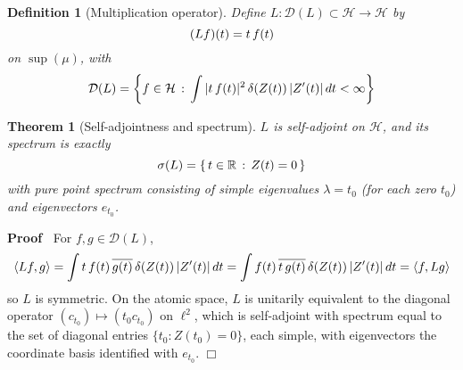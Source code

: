 \documentclass{article}
\newenvironment{proof}{\noindent\textbf{Proof\ }}{\hspace*{\fill}$\Box$\medskip}
\newtheorem{definition}{Definition}
\newtheorem{theorem}{Theorem}
\begin{document}
\begin{definition}
  [Multiplication operator] Define $L : \mathcal{D} (L) \subset \mathcal{H}
  \to \mathcal{H}$ by
  \begin{equation}
    (Lf) (t) = t \hspace{0.17em} f (t)
  \end{equation}
  on $\sup (\mu)$, with
  \begin{equation}
    \mathcal{D} (L) = \left\{ f \in \mathcal{H} \hspace{0.17em} :
    \hspace{0.17em} \int |t \hspace{0.17em} f (t) |^2  \hspace{0.17em} \delta
    (Z (t)) \hspace{0.17em} |Z' (t) | \hspace{0.17em} dt < \infty \right\}
  \end{equation}
\end{definition}

\begin{theorem}
  [Self-adjointness and spectrum] $L$ is self-adjoint on $\mathcal{H}$, and
  its spectrum is exactly
  \begin{equation}
    \sigma (L) = \{ \hspace{0.17em} t \in \mathbb{R} \hspace{0.17em} :
    \hspace{0.17em} Z (t) = 0 \hspace{0.17em} \}
  \end{equation}
  with pure point spectrum consisting of simple eigenvalues $\lambda = t_0$
  (for each zero $t_0$) and eigenvectors $e_{t_0}$.
\end{theorem}

\begin{proof}
  For $f, g \in \mathcal{D} (L)$,
  \begin{equation}
    \langle Lf, g \rangle = \int t \hspace{0.17em} f (t) \hspace{0.17em}
    \overline{g (t)} \hspace{0.17em} \delta (Z (t)) \hspace{0.17em} |Z' (t) | 
    \hspace{0.17em} dt = \int f (t) \hspace{0.17em} \overline{t
    \hspace{0.17em} g (t)} \hspace{0.17em} \delta (Z (t)) \hspace{0.17em} |Z'
    (t) |  \hspace{0.17em} dt = \langle f, Lg \rangle
  \end{equation}
  so $L$ is symmetric. On the atomic space, $L$ is unitarily equivalent to the
  diagonal operator $(c_{t_0}) \mapsto (t_0 c_{t_0})$ on $\ell^2$, which is
  self-adjoint with spectrum equal to the set of diagonal entries $\{t_0 : Z
  (t_0) = 0\}$, each simple, with eigenvectors the coordinate basis identified
  with $e_{t_0}$.
\end{proof}
\end{document}

